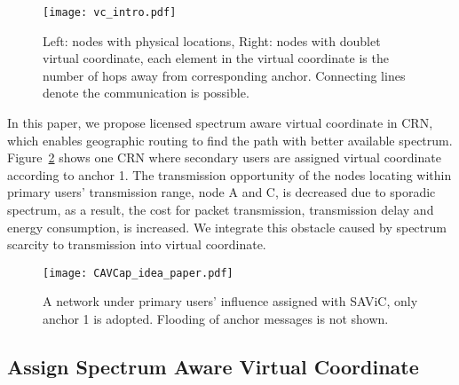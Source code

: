 \begin{figure}
\centering
\texttt{[image: vc\_intro.pdf]}
\caption{Left: nodes with physical locations, Right: nodes with doublet virtual coordinate, each element in the virtual coordinate is the number of hops away from corresponding anchor. Connecting lines denote the communication is possible.}
\label{fig:vc_intro}
\end{figure}


In this paper, we propose licensed spectrum aware virtual coordinate in CRN, which enables geographic routing to find the path with better available spectrum.
Figure~\ref{fig:SA-VCapidea} shows one CRN where secondary users are assigned virtual coordinate according to anchor 1.
The transmission opportunity of the nodes locating within primary users' transmission range, \eg node A and C, is decreased due to sporadic spectrum, as a result, the cost for packet transmission, \eg transmission delay and energy consumption, is increased.
We integrate this obstacle caused by spectrum scarcity to transmission into virtual coordinate.


\begin{figure}
\centering
\texttt{[image: CAVCap\_idea\_paper.pdf]}
\caption{A network under primary users' influence assigned with SAViC, only anchor 1 is adopted. Flooding of anchor messages is not shown.}
\label{fig:SA-VCapidea}
\end{figure}


\subsection{Assign Spectrum Aware Virtual Coordinate}

